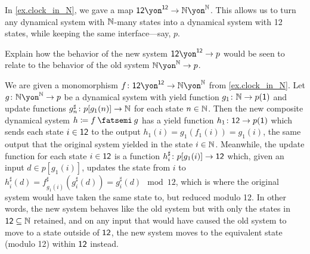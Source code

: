 \documentclass[Book-Poly]{subfiles}
\begin{document}
\begin{exercise}
In \cref{ex.clock_in_N}, we gave a map $\1\2\yon^{\1\2}\to\nn\yon^\nn$. This allows us to turn any dynamical system with $\mathbb{N}$-many states into a dynamical system with 12 states, while keeping the same interface---say, $p$. 

Explain how the behavior of the new system $\1\2\yon^{\1\2}\to p$ would be seen to relate to the behavior of the old system $\nn\yon^\nn\to p$.
\begin{solution}
We are given a monomorphism $f \colon \1\2\yon^{\1\2} \to \nn\yon^\nn$ from \cref{ex.clock_in_N}.
Let $g \colon \nn\yon^\nn \to p$ be a dynamical system with yield function $g_1 \colon \mathbb{N} \to p(\textsf{1})$ and update functions $g^\sharp_n \colon p[g_1(n)] \to \mathbb{N}$ for each state $n \in \mathbb{N}$.
Then the new composite dynamical system $h \coloneqq f \then g$ has a yield function $h_1 \colon \textsf{1}\textsf{2} \to p(\textsf{1})$ which sends each state $i \in \textsf{1}\textsf{2}$ to the output $h_1(i) = g_1(f_1(i)) = g_1(i)$, the same output that the original system yielded in the state $i \in \mathbb{N}$.
Meanwhile, the update function for each state $i \in \textsf{1}\textsf{2}$ is a function $h^\sharp_i \colon p[g_1(i)] \to \textsf{1}\textsf{2}$ which, given an input $d \in p[g_1(i)]$, updates the state from $i$ to $h^\sharp_i(d) = f^\sharp_{g_1(i)}(g^\sharp_i(d)) = g^\sharp_i(d) \mod 12$, which is where the original system would have taken the same state to, but reduced modulo 12.
In other words, the new system behaves like the old system but with only the states in $\textsf{1}\textsf{2} \subseteq \mathbb{N}$ retained, and on any input that would have caused the old system to move to a state outside of $\textsf{1}\textsf{2}$, the new system moves to the equivalent state (modulo 12) within $\textsf{1}\textsf{2}$ instead. 
\end{solution}
\end{exercise}
\end{document}
